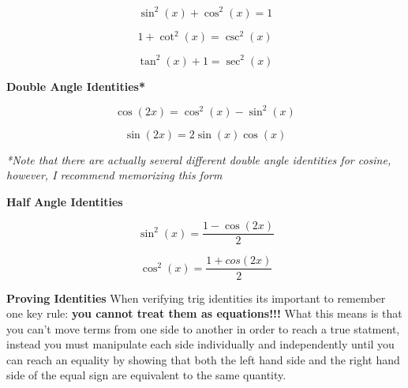 \documentclass[addpoints]{exam}
\begin{document}
\begin{tcolorbox}[breakable, title=TRIG IDENTITIES, colframe=black, sharp corners, colback=white, colbacktitle=white, coltitle=black]
        \begin{minipage}{0.3\linewidth}
            \[
            \sin^2\left(x\right) + \cos^2(x) = 1
            \]
        \end{minipage}
        \hfill
        \begin{minipage}{0.3\linewidth}
            \[
            1 + \cot^2(x) = \csc^2(x)
            \]
        \end{minipage}
        \hfill
        \begin{minipage}{0.3\linewidth}
           \[
            \tan^2(x) + 1 = \sec^2(x)
           \] 
        \end{minipage}
        \newline 
        \begin{center}
            \textbf{Double Angle Identities\small{*}}
        \end{center}
        \begin{minipage}{0.45\linewidth}
            \[
            \cos(2x)=\cos^2(x) - \sin^2(x)
            \]
        \end{minipage}
        \hfill
        \begin{minipage}{0.45\linewidth}
            \[
            \sin(2x)=2\sin(x)\cos(x)
            \]
        \end{minipage}
        \newline\textit{*Note that there are actually several different double angle identities for cosine, however, I recommend memorizing this form}
        \newline 
        \begin{center}
            \textbf{Half Angle Identities}
        \end{center}
        \begin{minipage}{0.45\linewidth}
            \[\displaystyle\,
            \sin^2(x)=\frac{1-\cos(2x)}{2}
            \]
        \end{minipage}
        \hfill
        \begin{minipage}{0.45\linewidth}
            \[\displaystyle\,
            \cos^2(x)=\frac{1+cos(2x)}{2} 
            \]
        \end{minipage}
        \noindent\makebox[\linewidth]{\hrulefill}
        \vspace{0.1in}
        \newline\Large\textbf{Proving Identities}
        \newline\normalsize When verifying trig identities its important to remember one key rule: \textbf{you cannot treat them as equations!!!} What this means is that you can't move terms from one side to another in order to reach a true statment, instead you must manipulate each side individually and independently until you can reach an equality by showing that both the left hand side and the right hand side of the equal sign are equivalent to the same quantity. 

\end{tcolorbox}
\end{document}
